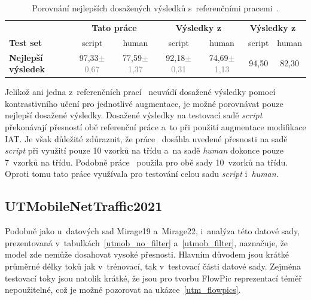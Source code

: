 \begin{table}[H]
    \centering
    \begin{tabular}{lcccccc}
        \toprule
          & \multicolumn{2}{c}{\textbf{Tato práce}} & \multicolumn{2}{c}{\textbf{Výsledky z~\cite{huawei_paper}}} & \multicolumn{2}{c}{\textbf{Výsledky z~\cite{flowpic_augmentations}}}\\
          \cmidrule(lr){2-3} \cmidrule(lr){4-5} \cmidrule(lr){6-7}
         \textbf{Test set} & script & human & script & human & script & human \\
        \midrule
            \textbf{Nejlepší výsledek} & 97,33{\tiny\textcolor{gray}{$\pm$ 0,67}} & 77,59{\tiny\textcolor{gray}{$\pm$ 1,37}} & 92,18{\tiny\textcolor{gray}{$\pm$ 0,31}} & 74,69{\tiny\textcolor{gray}{$\pm$ 1,13}} & 94,50 & 82,30\\
        \bottomrule
    \end{tabular}
    \caption{Porovnání nejlepších dosažených výsledků s~referenčními pracemi~\cite{huawei_paper, flowpic_augmentations}.}
\end{table}

Jelikož ani jedna z~referenčních prací~\cite{huawei_paper, flowpic_augmentations} neuvádí dosažené výsledky pomocí kontrastivního učení pro jednotlivé augmentace, je možné porovnávat pouze nejlepší dosažené výsledky. Dosažené výsledky na testovací sadě \textit{script} překonávají přesností obě referenční práce a~to při použití augmentace modifikace IAT. Je však důležité zdůraznit, že práce~\cite{flowpic_augmentations} dosáhla uvedené přesnosti na sadě \textit{script} při využití pouze 10 vzorků na třídu a~na sadě \textit{human} dokonce pouze 7~vzorků na třídu. Podobně práce~\cite{huawei_paper} použila pro obě sady 10~vzorků na třídu. Oproti tomu tato práce využívala pro testování celou sadu \textit{script} i~\textit{human}.

\subsection{UTMobileNetTraffic2021}
Podobně jako u~datových sad Mirage19 a~Mirage22, i~analýza této datové sady, prezentovaná v~tabulkách~\ref{utmob_no_filter} a~\ref{utmob_filter}, naznačuje, že model zde nemůže dosahovat vysoké přesnosti. Hlavním důvodem jsou krátké průměrné délky toků jak v~trénovací, tak v~testovací části datové sady. Zejména testovací toky jsou natolik krátké, že jsou pro tvorbu FlowPic reprezentací téměř nepoužitelné, což je možné pozorovat na ukázce~\ref{utm_flowpics}.

